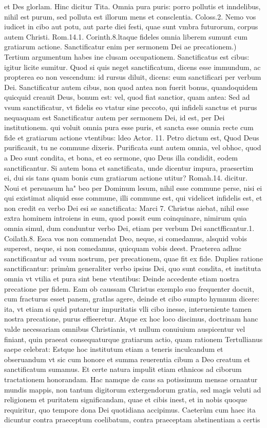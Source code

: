 \documentclass{article}
\begin{document}
\begin{pages}
\marginpar{[ p.95 ]}\pstart et Des glorlam. Hinc dicitur Tita. Omnia pura puris: porro pollutis et inndelibus, nihil est purum, sed polluta est illorum mens et consclentia. Coloss.2. Nemo vos iudicet in cibo aut potu, aut parte diei festi, quae sunt vmbra futurorum, corpus autem Christi. Rom.14.1. Corinth.8.ltaque fideles omnia liberem sumunt cum gratiarum actione.  \pend\pstart Sanctificatur enim per sermonem Dei ae precationem.) Tertium argumentum habes ine clusam occupationem. Sanctificatus est cibus: igitur licite sumitur. Quod si quis neget sanctificatum, dicens esse immundum, ac propterea eo non vescendum: id rursus diluit, dicens: eum sanctificari per verbum Dei. Sanctificatur autem cibus, non quod antea non fuerit bonus, quandoquidem quicquid creauit Deus, bonum est: vel, quod fiat sanctior, quam antea: Sed ad vsum sanctificatur, vt fidelis eo vtatur sine peccoto, qui infideli sanctus et purus nequaquam est Sanctificatur autem per sermonem Dei, id est, per Dei institutionem. qui voluit omnia pura esse puris, et sancta esse omnia recte cum fide et gratiarum actione vtentibus: ldeo Actor. 11. Petro dictum est, Quod Deus purificauit, tu ne commune dixeris. Purificata sunt autem omnia, vel obhoc, quod a Deo sunt condita, et bona, et eo sermone, quo Deus illa condidit, eodem sanctificantur. Si autem bona et sanctificata, unde dicentur impura, praesertim ei, dui sis tans quam bonis cum gratiarum actione utitur? Romah.14. dicitur. Noui et persuasum ha" beo per Dominum lesum, nihil esse commune perse, nisi ei qui existimat aliquid esse  commune, illi commune est, qui videlicet infidelis est, et non credit ea verbo Dei esi  se sanctificata: Marci 7. Christus aiebat, nihil esse extra hominem introiens in eum, quod possit eum coinquinare, nimirum quia omnia simul, dum conduntur verbo Dei, etiam per verbum Dei sanctfficantur.1. Coilath.8. Esca vos non commendat Deo, neque, si comedamus, alsquid vobis superest, neque, si non comedamus, quicquam vobis deest. Praeterea adhuc sanctificantur ad vsum nostrum, per precationem, quae fit ex fide. Duplies ratione sanctificantur: primùm generaliter verbo ipsius Dei, quo sunt condita, et instituta omnia vt vtilia et pura sint bene vtentibus: Deinde accedente etiam nostra precatione per fidem. Eam ob caussam Christus exemplo suo frequenter docuit, cum fracturus esset panem, gratlas agere, deinde et cibo sumpto hymnum dicere: ita, vt etiam si quid putaretur impuritatis vlli cibo inesse, interueniente tamen nostra precatione, purus effieeretur. Atque ex hoc loco discimus, doctrinam hanc valde necessariam omnibus Christianis, vt nullum conuiuium auspicentur vel finiant, quin praeeat consequaturque gratiarum actio, quam rationem Tertullianus saepe celebrat: Estque hoc institutum etiam a teneris inculcandum et obseruandum vt sic cum honore et summa reuerentia cibum a Deo creatum et sanctificatum sumamus. Et certe natura impulit etiam ethnicos ad ciborum tractationem honorandam. Hac namque de caus sa potissimum mensae ornantur mundis mappis, non tantum digitorum extergendorum gratia, sed magis veluti ad religionem et puritatem significandam, quae et cibis inest, et in nobis quoque requiritur, quo tempore dona Dei quotidiana accipimus. Caeterùm cum haec ita dicuntur contra praeceptum coelibatum, contra praeceptam abstinentiam a certis 
\end{pages}
\end{document}
